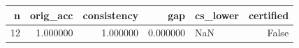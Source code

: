 \begin{tabular}{rrrrlr}
\toprule
n & orig_acc & consistency & gap & cs_lower & certified \\
\midrule
12 & 1.000000 & 1.000000 & 0.000000 & NaN & False \\
\bottomrule
\end{tabular}
